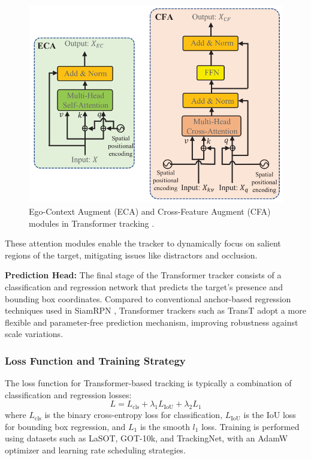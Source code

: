 \begin{figure}[ht]
    \centering
    \includegraphics[width=0.8\linewidth]{images/ecs-cfa.png}
    \caption{Ego-Context Augment (ECA) and Cross-Feature Augment (CFA) modules in Transformer tracking \cite{chen2021transformer}.}
    \label{fig:eca_cfa}
\end{figure}

These attention modules enable the tracker to dynamically focus on salient regions of the target, mitigating issues like distractors and occlusion.

\textbf{Prediction Head: }The final stage of the Transformer tracker consists of a classification and regression network that predicts the target's presence and bounding box coordinates. Compared to conventional anchor-based regression techniques used in SiamRPN \cite{li2018high}, Transformer trackers such as TransT \cite{chen2021transformer} adopt a more flexible and parameter-free prediction mechanism, improving robustness against scale variations.

\subsubsection{Loss Function and Training Strategy}
The loss function for Transformer-based tracking is typically a combination of classification and regression losses:
\begin{equation}
L = L_{\text{cls}} + \lambda_{1} L_{\text{IoU}} + \lambda_{2} L_{1}
\end{equation}
where $L_{\text{cls}}$ is the binary cross-entropy loss for classification, $L_{\text{IoU}}$ is the IoU loss for bounding box regression, and $L_{1}$ is the smooth $l_1$ loss. Training is performed using datasets such as LaSOT, GOT-10k, and TrackingNet, with an AdamW optimizer and learning rate scheduling strategies.

